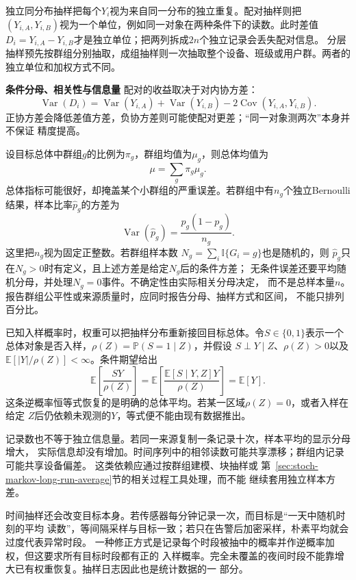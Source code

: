 独立同分布抽样把每个\(Y_i\)视为来自同一分布的独立重复。配对抽样则把
\((Y_{i,A},Y_{i,B})\)视为一个单位，例如同一对象在两种条件下的读数。此时差值
\(D_i=Y_{i,A}-Y_{i,B}\)才是独立单位；把两列拆成\(2n\)个独立记录会丢失配对信息。
分层抽样预先按群组分别抽取，成组抽样则一次抽取整个设备、班级或用户群。两者的
独立单位和加权方式不同。

\par\medskip\noindent\textbf{条件分母、相关性与信息量}\quad
配对的收益取决于对内协方差：
\[
  \operatorname{Var}(D_i)
  =\operatorname{Var}(Y_{i,A})+\operatorname{Var}(Y_{i,B})
   -2\operatorname{Cov}(Y_{i,A},Y_{i,B}).
\]
正协方差会降低差值方差，负协方差则可能使配对更差；“同一对象测两次”本身并不保证
精度提高。

设目标总体中群组\(g\)的比例为\(\pi_g\)，群组均值为\(\mu_g\)，则总体均值为
\[
  \mu=\sum_g\pi_g\mu_g.
\]
总体指标可能很好，却掩盖某个小群组的严重误差。若群组中有\(n_g\)个独立Bernoulli
结果，样本比率\(\widehat p_g\)的方差为
\[
  \operatorname{Var}(\widehat p_g)
  =\frac{p_g(1-p_g)}{n_g}.
\]
这里把\(n_g\)视为固定正整数。若群组样本数
\(N_g=\sum_i\mathbb{I}\{G_i=g\}\)也是随机的，则
\(\widehat p_g\)只在\(N_g>0\)时有定义，且上述方差是给定\(N_g\)后的条件方差；
无条件误差还要平均随机分母，并处理\(N_g=0\)事件。不确定性由实际相关分母决定，
而不是总样本量\(n\)。报告群组公平性或来源质量时，应同时报告分母、抽样方式和区间，
不能只排列百分比。

已知入样概率时，权重可以把抽样分布重新接回目标总体。令\(S\in\{0,1\}\)表示一个
总体对象是否入样，\(\rho(Z)=\mathbb{P}(S=1\mid Z)\)，并假设
\(S\mathrel{\perp}Y\mid Z\)、\(\rho(Z)>0\)以及
\(\mathbb{E}[|Y|/\rho(Z)]<\infty\)。条件期望给出
\[
  \mathbb{E}\left[\frac{SY}{\rho(Z)}\right]
  =\mathbb{E}\left[
    \frac{\mathbb{E}[S\mid Y,Z]Y}{\rho(Z)}
  \right]
  =\mathbb{E}[Y].
\]
这条逆概率恒等式恢复的是明确的总体平均。若某一区域\(\rho(Z)=0\)，或者入样在给定
\(Z\)后仍依赖未观测的\(Y\)，等式便不能由现有数据推出。

记录数也不等于独立信息量。若同一来源复制一条记录十次，样本平均的显示分母增大，
实际信息却没有增加。时间序列中的相邻读数可能共享漂移；群组内记录可能共享设备偏差。
这类依赖应通过按群组建模、块抽样或
第~\ref{sec:stoch-markov-long-run-average}节的相关过程工具处理，而不能
继续套用独立样本方差。

时间抽样还会改变目标本身。若传感器每分钟记录一次，而目标是“一天中随机时刻的平均
读数”，等间隔采样与目标一致；若只在告警后加密采样，朴素平均就会过度代表异常时段。
一种修正方式是记录每个时段被抽中的概率并作逆概率加权，但这要求所有目标时段都有正的
入样概率。完全未覆盖的夜间时段不能靠增大已有权重恢复。抽样日志因此也是统计数据的一
部分。


